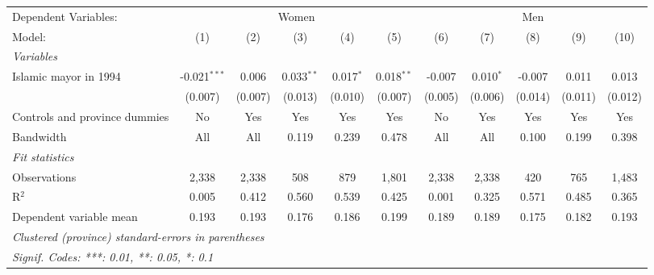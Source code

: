 
\begingroup
\centering
\begin{adjustbox}{max width=\textwidth}
   \begin{tabular}{lcccccccccc}
      \tabularnewline \midrule \midrule
      Dependent Variables: & \multicolumn{5}{c}{Women} & \multicolumn{5}{c}{Men}\\
      Model:                        & (1)            & (2)     & (3)          & (4)         & (5)          & (6)     & (7)         & (8)     & (9)     & (10)\\  
      \midrule
      \emph{Variables}\\
      Islamic mayor in 1994         & -0.021$^{***}$ & 0.006   & 0.033$^{**}$ & 0.017$^{*}$ & 0.018$^{**}$ & -0.007  & 0.010$^{*}$ & -0.007  & 0.011   & 0.013\\   
                                    & (0.007)        & (0.007) & (0.013)      & (0.010)     & (0.007)      & (0.005) & (0.006)     & (0.014) & (0.011) & (0.012)\\   
      Controls and province dummies & No             & Yes     & Yes          & Yes         & Yes          & No      & Yes         & Yes     & Yes     & Yes\\  
      Bandwidth                     & All            & All     & 0.119        & 0.239       & 0.478        & All     & All         & 0.100   & 0.199   & 0.398\\  
      \midrule
      \emph{Fit statistics}\\
      Observations                  & 2,338          & 2,338   & 508          & 879         & 1,801        & 2,338   & 2,338       & 420     & 765     & 1,483\\  
      R$^2$                         & 0.005          & 0.412   & 0.560        & 0.539       & 0.425        & 0.001   & 0.325       & 0.571   & 0.485   & 0.365\\  
      Dependent variable mean       & 0.193          & 0.193   & 0.176        & 0.186       & 0.199        & 0.189   & 0.189       & 0.175   & 0.182   & 0.193\\  
      \midrule \midrule
      \multicolumn{11}{l}{\emph{Clustered (province) standard-errors in parentheses}}\\
      \multicolumn{11}{l}{\emph{Signif. Codes: ***: 0.01, **: 0.05, *: 0.1}}\\
   \end{tabular}
\end{adjustbox}
\par\endgroup



